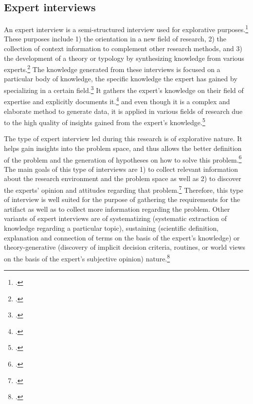 \subsection{Expert interviews} \label{subsec:ExpertInterviews}
An expert interview is a semi-structured interview used for explorative purposes.\footcites[Cf.][p.179]{Flickintroductionqualitativeresearch2009}[cf.][p.465]{MeuserExperteninterviewkonzeptionelleGrundlagen2009}[cf.][p.31]{BognerInterviewsmitExperten2014} These purposes include 1) the orientation in a new field of research, 2) the collection of context information to complement other research methods, and 3) the development of a theory or typology by synthesizing knowledge from various experts.\footcite[Cf.][p.180]{Flickintroductionqualitativeresearch2009} The knowledge generated from these interviews is focused on a particular body of knowledge, the specific knowledge the expert has gained by specializing in a certain field.\footcites[Cf.][p.423]{BuberQualitativeMarktforschungKonzepte2007}[cf.][p.450]{PfadenhauerExperteninterviewGesprachauf2007} It gathers the expert's knowledge on their field of expertise and explicitly documents it.\footcites[Cf.][p.466]{MeuserExperteninterviewkonzeptionelleGrundlagen2009}[cf.][p.451]{PfadenhauerExperteninterviewGesprachauf2007}[cf.][p.172]{HickeyElicitationtechniqueselection2003} and even though it is a complex and elaborate method to generate data, it is applied in various fields of research due to the high quality of insights gained from the expert's knowledge.\footcites[Cf.][p.459]{PfadenhauerExperteninterviewGesprachauf2007}[cf.][p.442]{MeuserExpertInneninterviewsvielfacherprobt1991}[cf.][p.424]{BuberQualitativeMarktforschungKonzepte2007} 

The type of expert interview led during this research is of explorative nature. It helps gain insights into the problem space, and thus allows the better definition of the problem and the generation of hypotheses on how to solve this problem.\footcite[Cf.][p.28]{BognerInterviewsmitExperten2014} The main goals of this type of interviews are 1) to collect relevant information about the research environment and the problem space as well as 2) to discover the experts' opinion and attitudes regarding that problem.\footcite[Cf.][pp.28/29]{BognerInterviewsmitExperten2014} Therefore, this type of interview is well suited for the purpose of gathering the requirements for the artifact as well as to collect more information regarding the problem. Other variants of expert interviews are of systematizing (systematic extraction of knowledge regarding a particular topic), sustaining (scientific definition, explanation and connection of terms on the basis of the expert's knowledge) or theory-generative (discovery of implicit decision criteria, routines, or world views on the basis of the expert's subjective opinion) nature.\footcites[Cf.][pp.27-30]{BognerInterviewsmitExperten2014}[cf.][p.421]{AghamanoukjanQualitativeInterviews2007}[cf.][p.180]{Flickintroductionqualitativeresearch2009}

